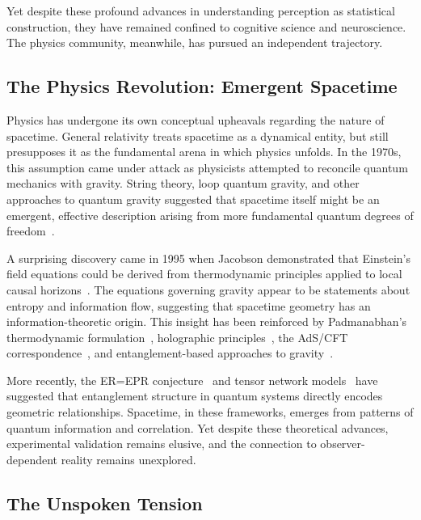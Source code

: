 \documentclass[11pt]{article}
\begin{document}
Yet despite these profound advances in understanding perception as statistical construction, they have remained confined to cognitive science and neuroscience. The physics community, meanwhile, has pursued an independent trajectory.

\subsection{The Physics Revolution: Emergent Spacetime}

Physics has undergone its own conceptual upheavals regarding the nature of spacetime. General relativity treats spacetime as a dynamical entity, but still presupposes it as the fundamental arena in which physics unfolds. In the 1970s, this assumption came under attack as physicists attempted to reconcile quantum mechanics with gravity. String theory, loop quantum gravity, and other approaches to quantum gravity suggested that spacetime itself might be an emergent, effective description arising from more fundamental quantum degrees of freedom~\cite{Carlip2014}.

A surprising discovery came in 1995 when Jacobson demonstrated that Einstein's field equations could be derived from thermodynamic principles applied to local causal horizons~\cite{Jacobson1995}. The equations governing gravity appear to be statements about entropy and information flow, suggesting that spacetime geometry has an information-theoretic origin. This insight has been reinforced by Padmanabhan's thermodynamic formulation~\cite{Padmanabhan2010}, holographic principles~\cite{Bousso2002}, the AdS/CFT correspondence~\cite{Maldacena1999}, and entanglement-based approaches to gravity~\cite{VanRaamsdonk2010}.

More recently, the ER=EPR conjecture~\cite{MaldacenaSusskind2013} and tensor network models~\cite{Swingle2012} have suggested that entanglement structure in quantum systems directly encodes geometric relationships. Spacetime, in these frameworks, emerges from patterns of quantum information and correlation. Yet despite these theoretical advances, experimental validation remains elusive, and the connection to observer-dependent reality remains unexplored.

\subsection{The Unspoken Tension}
\end{document}
